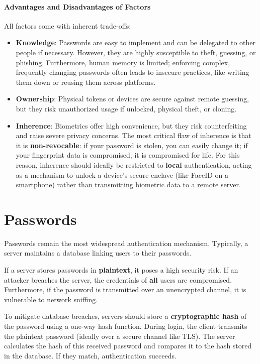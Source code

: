 \paragraph{Advantages and Disadvantages of Factors}
All factors come with inherent trade-offs:
\begin{itemize}
    \item \textbf{Knowledge}: Passwords are easy to implement and can be delegated to other people if necessary. However, they are highly susceptible to theft, guessing, or phishing. Furthermore, human memory is limited; enforcing complex, frequently changing passwords often leads to insecure practices, like writing them down or reusing them across platforms.
    \item \textbf{Ownership}: Physical tokens or devices are secure against remote guessing, but they risk unauthorized usage if unlocked, physical theft, or cloning.
    \item \textbf{Inherence}: Biometrics offer high convenience, but they risk counterfeiting and raise severe privacy concerns. The most critical flaw of inherence is that it is \textbf{non-revocable}: if your password is stolen, you can easily change it; if your fingerprint data is compromised, it is compromised for life. For this reason, inherence should ideally be restricted to \textbf{local} authentication, acting as a mechanism to unlock a device's secure enclave (like FaceID on a smartphone) rather than transmitting biometric data to a remote server.
\end{itemize}

\section{Passwords}
Passwords remain the most widespread authentication mechanism. Typically, a server maintains a database linking users to their passwords.

If a server stores passwords in \textbf{plaintext}, it poses a high security risk. If an attacker breaches the server, the credentials of \textbf{all} users are compromised. Furthermore, if the password is transmitted over an unencrypted channel, it is vulnerable to network sniffing.

To mitigate database breaches, servers should store a \textbf{cryptographic hash} of the password using a one-way hash function. During login, the client transmits the plaintext password (ideally over a secure channel like TLS). The server calculates the hash of this received password and compares it to the hash stored in the database. If they match, authentication succeeds.

